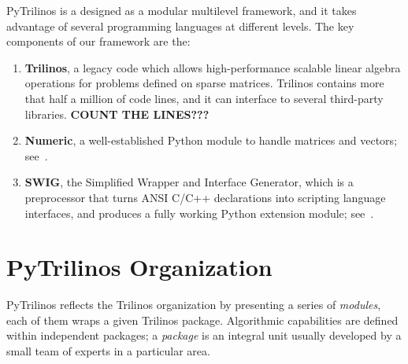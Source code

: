\documentclass[10pt,relax]{SANDreport}
\begin{document}
PyTrilinos is a designed as a modular multilevel framework, and it takes advantage of several
programming languages at different levels. 
The key components of our framework are the:
\begin{enumerate}
\item {\bf Trilinos}, a legacy code which allows high-performance scalable
linear algebra operations for problems defined on sparse matrices. Trilinos
contains more that half a million of code lines, and it can interface to
several third-party libraries. 
{\bf COUNT THE LINES???}

\item {\bf Numeric}, a well-established Python module to handle matrices and
vectors; see~\cite{numeric}.
\item {\bf SWIG}, the Simplified Wrapper and Interface Generator, which
is a  preprocessor
that turns ANSI C/C++ declarations into scripting language interfaces, and
produces a fully working Python extension module; see~\cite{swig}.
\end{enumerate}

\section{PyTrilinos Organization}
\label{sec:organization}

PyTrilinos reflects the Trilinos organization by presenting
a series of {\sl modules}, each of them wraps a given Trilinos package.
Algorithmic capabilities are defined within independent packages; a {\sl
  package} is an integral unit usually developed by a small team of experts in
  a particular area. 
\end{document}
